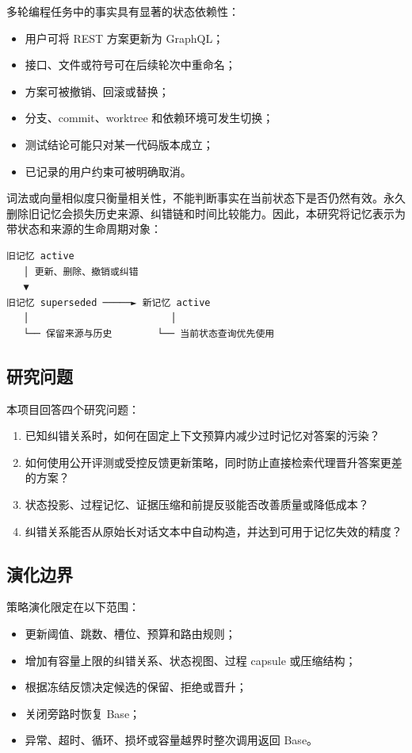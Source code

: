 多轮编程任务中的事实具有显著的状态依赖性：

\begin{itemize}
\item 用户可将 REST 方案更新为 GraphQL；
\item 接口、文件或符号可在后续轮次中重命名；
\item 方案可被撤销、回滚或替换；
\item 分支、commit、worktree 和依赖环境可发生切换；
\item 测试结论可能只对某一代码版本成立；
\item 已记录的用户约束可被明确取消。
\end{itemize}

词法或向量相似度只衡量相关性，不能判断事实在当前状态下是否仍然有效。永久删除旧记忆会损失历史来源、纠错链和时间比较能力。因此，本研究将记忆表示为带状态和来源的生命周期对象：

\begin{Verbatim}[fontsize=\small]
旧记忆 active
   │ 更新、删除、撤销或纠错
   ▼
旧记忆 superseded ─────► 新记忆 active
   │                         │
   └── 保留来源与历史        └── 当前状态查询优先使用
\end{Verbatim}

\subsection{研究问题}

本项目回答四个研究问题：

\begin{enumerate}
\item 已知纠错关系时，如何在固定上下文预算内减少过时记忆对答案的污染？
\item 如何使用公开评测或受控反馈更新策略，同时防止直接检索代理晋升答案更差的方案？
\item 状态投影、过程记忆、证据压缩和前提反驳能否改善质量或降低成本？
\item 纠错关系能否从原始长对话文本中自动构造，并达到可用于记忆失效的精度？
\end{enumerate}

\subsection{演化边界}

策略演化限定在以下范围：

\begin{itemize}
\item 更新阈值、跳数、槽位、预算和路由规则；
\item 增加有容量上限的纠错关系、状态视图、过程 capsule 或压缩结构；
\item 根据冻结反馈决定候选的保留、拒绝或晋升；
\item 关闭旁路时恢复 Base；
\item 异常、超时、循环、损坏或容量越界时整次调用返回 Base。
\end{itemize}

